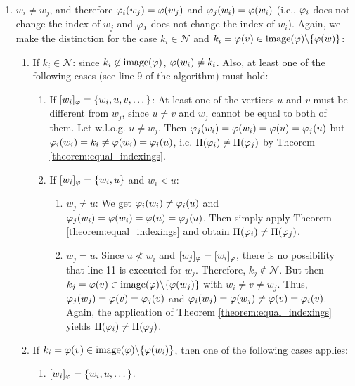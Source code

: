 \begin{appendixproof}
\begin{enumerate}
\begin{enumerate}
        \end{enumerate}
        \item $w_i \neq w_j$, and therefore $\varphi_i(w_j) = \varphi(w_j)$ and $\varphi_j(w_i) = \varphi(w_i)$ (i.e., $\varphi_i$ does not change the index of $w_j$ and $\varphi_j$ does not change the index of $w_i$). Again, we make the distinction for the case $k_i \in \mathcal{N}$ and $k_i = \varphi(v) \in \mathrm{image}(\varphi)\backslash \{ \varphi(w) \}$:
        \begin{enumerate}
            \item If $k_i \in \mathcal{N}$: since $k_i \not\in \mathrm{image}(\varphi)$, $\varphi(w_i) \neq k_i$. Also, at least one of the following cases (see line 9 of the algorithm) must hold:
            \begin{enumerate}
                \item If $[w_i]_\varphi = \{ w_i, u, v, \dots \}$: At least one of the vertices $u$ and $v$ must be different from $w_j$, since $u \neq v$ and $w_j$ cannot be equal to both of them. Let w.l.o.g. $u \neq w_j$. Then $\varphi_j(w_i) = \varphi(w_i) = \varphi(u) = \varphi_j(u)$ but $\varphi_i(w_i) = k_i \neq \varphi(w_i) = \varphi_i(u)$, i.e. $\Pi(\varphi_i) \neq \Pi(\varphi_j)$ by Theorem \ref{theorem:equal_indexings}.
                \item If $[w_i]_\varphi = \{w_i, u \}$ and $w_i < u$: 
                \begin{enumerate}
                    \item $w_j \neq u$: We get $\varphi_i(w_i) \neq \varphi_i(u)$ and $\varphi_j(w_i) = \varphi(w_i) = \varphi(u) = \varphi_j(u)$. Then simply apply Theorem \ref{theorem:equal_indexings} and obtain $\Pi(\varphi_i) \neq \Pi(\varphi_j)$.
                    \item $w_j = u$. Since $u \not< w_i$ and $[w_j]_\varphi = [w_i]_\varphi$, there is no possibility that line 11 is executed for $w_j$. Therefore, $k_j \not\in \mathcal{N}$. But then $k_j= \varphi(v) \in \mathrm{image}(\varphi)\backslash \{ \varphi(w_j) \}$ with $w_i \neq v \neq w_j$. Thus, $\varphi_j(w_j) = \varphi(v)=\varphi_j(v)$ and $\varphi_i(w_j) = \varphi(w_j) \neq \varphi(v) = \varphi_i(v)$. Again, the application of Theorem \ref{theorem:equal_indexings} yields $\Pi(\varphi_i) \neq \Pi(\varphi_j)$.
                \end{enumerate}
            \end{enumerate}
            \item If $k_i = \varphi(v) \in \mathrm{image}(\varphi)\backslash \{ \varphi(w_i) \}$, then one of the following cases applies:
            \begin{enumerate}
                \item $[w_i]_\varphi = \{w_i,u,\dots\}$. 

\end{enumerate}
\end{enumerate}
\end{enumerate}
\end{appendixproof}
